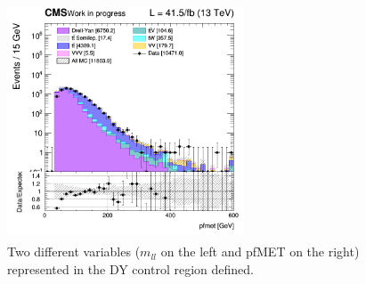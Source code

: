 \documentclass[a4paper, 10pt, openright]{report}
\begin{document}
\begin{figure}[htbp]
{\begin{minipage}[b]{.48\textwidth}
\end{minipage}\hfill
\begin{minipage}[b]{.48\textwidth}
\includegraphics[width=7cm, height=7cm]{figs/2017/log_cratio_dyCR_ll_METcorrected_pt.png}
\end{minipage} \hfill
}
\caption{Two different variables ($m_{ll}$ on the left and pf\ac{MET} on the right) represented in the \ac{DY} control region defined.}
\label{fig:DYCR2}
\end{figure}
\end{document}
